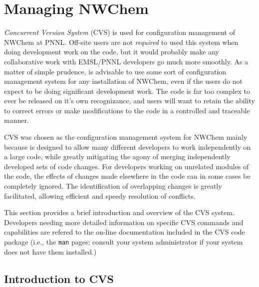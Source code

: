 \section{Managing NWChem}
\label{sec:cvs-intro}

{\it Concurrent Version System} (CVS) is used for configuration management of
NWChem at PNNL.  Off-site users are not {\em required} to used this system when 
doing development work on the code, but it would probably make any collaborative
work with EMSL/PNNL developers go much more smoothly.  As a matter of simple
prudence, is advisable to use some sort
of configuration management system for any installation of NWChem, even if
the users do not expect to be doing significant development work.  The code
is far too complex to ever be released on it's own recognizance, and users
will want to retain the ability to correct errors or make modifications to the
code in a controlled and traceable manner.  

CVS was chosen as the configuration management system for NWChem mainly
because is designed to allow many different developers to work independently
on a large code, while greatly mitigating the agony of merging independently
developed sets of code changes.  For developers working on unrelated modules
of the code, the effects of changes made elsewhere in the code can in some cases
be completely ignored.  The identification of overlapping changes is greatly
facilitated, allowing efficient and speedy resolution of conflicts.

This section provides a brief introduction and overview of the CVS system.
Developers needing more detailed information on specific CVS commands and
capabilities are refered to the on-line documentation included in the CVS 
code package (i.e., the \texttt{man} pages; consult your system administrator
if your system does not have them installed.)

\subsection{Introduction to CVS}


